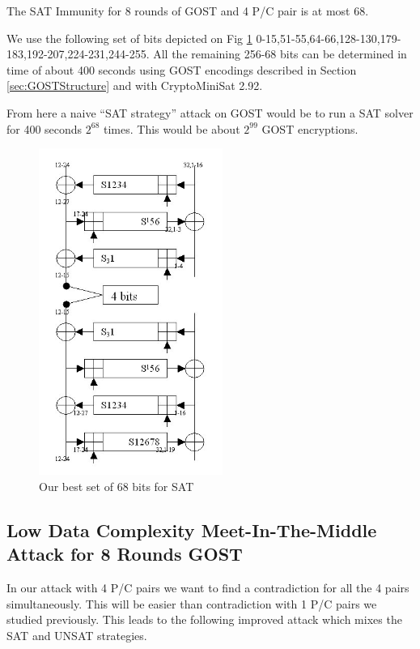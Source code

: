 \begin{lemma}
The SAT Immunity for 8 rounds of GOST and 4 P/C pair is at most 68.
\end{lemma}
	
We use the following set of bits
depicted on Fig \ref{Gost81optimal4KPSAT68Bits}
0-15,51-55,64-66,128-130,179-183,192-207,224-231,244-255.
All the remaining 256-68 bits can be determined in time of
about 400 seconds
using GOST encodings described in Section \ref{sec:GOSTStructure}
and with CryptoMiniSat 2.92.

From here a naive ``SAT strategy'' attack on GOST would be to run
a SAT solver for 400 seconds $2^{68}$ times.
This would be about $2^{99}$ GOST encryptions.


\begin{figure}[h!]
	\centering
	\includegraphics[width=60mm]{./pics/gost81optimalSAT4KP.jpg}
	\caption{Our best set of 68 bits for SAT}
	\label{Gost81optimal4KPSAT68Bits}
\end{figure}


\subsection{Low Data Complexity Meet-In-The-Middle Attack for 8 Rounds GOST}
\label{section:Fact8R4KP_94_SATMethod}
In our attack with 4 P/C pairs we want to find a contradiction for all the 4 pairs simultaneously.
This will be easier than contradiction with 1 P/C pairs we studied previously.
This leads to the following improved attack which mixes the SAT and UNSAT strategies.

